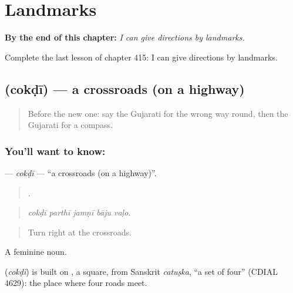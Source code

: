 
\chapter{Landmarks}
\label{ch:gu-landmarks}

\begin{chapteropening}
\textbf{By the end of this chapter:} \emph{I can give directions by landmarks.}

Complete the last lesson of chapter 415: I can give directions by landmarks.
\end{chapteropening}

\section[\texorpdfstring{\gu{ચોકડી} (cokḍī)}{ચોકડી (cokḍī)}]{ (cokḍī) — a crossroads (on a highway)}

\label{lesson:GU-C415-cokdi}



\begin{quote}
Before the new one: say the Gujarati for the wrong way round, then the Gujarati for a compass.
\end{quote}

\subsection*{You'll want to know: }
\textbf{} — \emph{cokḍī} — \textquotedblleft{}a crossroads (on a highway)\textquotedblright{}.

\begin{quote}
    .
\end{quote}

\begin{quote}
\emph{cokḍī parthī jamṇī bāju vaḷo.}
\end{quote}

\begin{quote}
Turn right at the crossroads.
\end{quote}

A feminine noun.

\begin{cousinweb}
\textbf{} (\emph{cokḍī}) is built on , a square, from Sanskrit \emph{catuṣka}, \textquotedblleft{}a set of four\textquotedblright{} (CDIAL 4629): the place where four roads meet.
\end{cousinweb}

